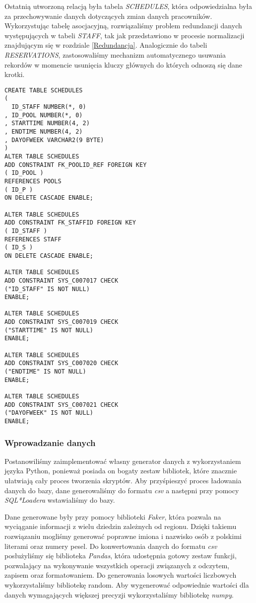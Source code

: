 \documentclass[a4paper]{article}
\begin{document}
\newpage

Ostatnią utworzoną relacją była tabela \textit{SCHEDULES}, która odpowiedzialna była za przechowywanie danych dotyczących zmian danych pracowników. Wykorzystując tabelę asocjacyjną, rozwiązaliśmy problem redundancji danych występujących w tabeli \textit{STAFF}, tak jak przedstawiono w procesie normalizacji znajdującym się w rozdziale \ref{Redundancja}. Analogicznie do tabeli \textit{RESERVATIONS}, zastosowaliśmy mechanizm automatycznego usuwania rekordów w momencie usunięcia kluczy głównych do których odnoszą się dane krotki.

\begin{verbatim}
CREATE TABLE SCHEDULES 
(
  ID_STAFF NUMBER(*, 0) 
, ID_POOL NUMBER(*, 0) 
, STARTTIME NUMBER(4, 2) 
, ENDTIME NUMBER(4, 2) 
, DAYOFWEEK VARCHAR2(9 BYTE) 
)
ALTER TABLE SCHEDULES
ADD CONSTRAINT FK_POOLID_REF FOREIGN KEY
( ID_POOL )
REFERENCES POOLS
( ID_P )
ON DELETE CASCADE ENABLE;

ALTER TABLE SCHEDULES
ADD CONSTRAINT FK_STAFFID FOREIGN KEY
( ID_STAFF )
REFERENCES STAFF
( ID_S )
ON DELETE CASCADE ENABLE;

ALTER TABLE SCHEDULES
ADD CONSTRAINT SYS_C007017 CHECK 
("ID_STAFF" IS NOT NULL)
ENABLE;

ALTER TABLE SCHEDULES
ADD CONSTRAINT SYS_C007019 CHECK 
("STARTTIME" IS NOT NULL)
ENABLE;

ALTER TABLE SCHEDULES
ADD CONSTRAINT SYS_C007020 CHECK 
("ENDTIME" IS NOT NULL)
ENABLE;

ALTER TABLE SCHEDULES
ADD CONSTRAINT SYS_C007021 CHECK 
("DAYOFWEEK" IS NOT NULL)
ENABLE;

\end{verbatim}

\subsubsection{Wprowadzanie danych}

Postanowiliśmy zaimplementować własny generator danych z wykorzystaniem języka Python, ponieważ posiada on bogaty zestaw bibliotek, które znacznie ułatwiają cały proces tworzenia skryptów. Aby przyśpieszyć proces ładowania danych do bazy, dane generowaliśmy do formatu \textit{csv} a następni przy pomocy \textit{SQL*Loadera} wstawialiśmy do bazy.

Dane generowane były przy pomocy biblioteki \textit{Faker}, która pozwala na wyciąganie informacji z wielu dziedzin zależnych od regionu. Dzięki takiemu rozwiązaniu mogliśmy generować poprawne imiona i nazwisko osób z polskimi literami oraz numery pesel. Do konwertowania danych do formatu \textit{csv} posłużyliśmy się biblioteka \textit{Pandas}, która udostępnia gotowy zestaw funkcji, pozwalający na wykonywanie wszystkich operacji związanych z odczytem, zapisem oraz formatowaniem. Do generowania losowych wartości liczbowych wykorzystaliśmy bibliotekę random. Aby wygenerować odpowiednie wartości dla danych wymagających większej precyzji wykorzystaliśmy bibliotekę \textit{numpy}.
\end{document}
